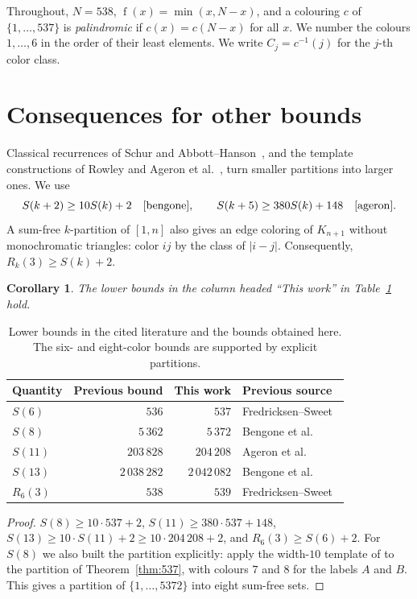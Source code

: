 \documentclass[11pt,a4paper]{article}
\newtheorem{corollary}[theorem]{Corollary}
\theoremstyle{definition}
\newcommand{\fold}{\operatorname{f}}
\begin{document}
Throughout, $N=538$, $\fold(x)=\min(x,N-x)$, and a colouring $c$ of
$\{1,\dots,537\}$ is \emph{palindromic} if $c(x)=c(N-x)$ for all $x$. We number the
colours $1,\dots,6$ in the order of their least elements. We write
$C_j=c^{-1}(j)$ for the $j$-th color class.

\section{Consequences for other bounds}\label{sec:consequences}
Classical recurrences of Schur and Abbott--Hanson~\cite{schur,abbott},
and the template constructions of Rowley and Ageron et al.~\cite{rowley,ageron},
turn smaller partitions into larger ones. We use
\[
S(k+2)\ge10S(k)+2\quad\text{\cite{bengone}},\qquad
S(k+5)\ge380S(k)+148\quad\text{\cite{ageron}}.
\]
A sum-free $k$-partition of $[1,n]$ also gives an edge coloring of $K_{n+1}$
without monochromatic triangles: color $ij$ by the class of $|i-j|$.
Consequently, $R_k(3)\ge S(k)+2$.

\begin{corollary}\label{cor:consequences}
The lower bounds in the column headed ``This work'' in Table~\ref{tab:bounds} hold.
\end{corollary}

\begin{table}[tbp]
\caption{Lower bounds in the cited literature and the bounds obtained here.
The six- and eight-color bounds are supported by explicit partitions.}
\label{tab:bounds}
\centering
\begin{tabular}{lrrl}
\toprule
Quantity & Previous bound & This work & Previous source\\
\midrule
$S(6)$    & $536$          & $537$            & Fredricksen--Sweet~\cite{fs}\\
$S(8)$    & $5\,362$       & $5\,372$         & Bengone et al.~\cite{bengone}\\
$S(11)$   & $203\,828$     & $204\,208$       & Ageron et al.~\cite{ageron}\\
$S(13)$   & $2\,038\,282$ & $2\,042\,082$    & Bengone et al.~\cite{bengone}\\
$R_6(3)$  & $538$          & $539$            & Fredricksen--Sweet~\cite{fs,xxer}\\
\bottomrule
\end{tabular}
\end{table}

\begin{proof}
$S(8)\ge10\cdot537+2$, $S(11)\ge380\cdot537+148$,
$S(13)\ge10\cdot S(11)+2\ge10\cdot204\,208+2$, and $R_6(3)\ge S(6)+2$. For $S(8)$ we also
built the partition explicitly: apply the width-$10$ template of
\cite[Table~II]{bengone} to the partition of Theorem~\ref{thm:537}, with colours $7$
and $8$ for the labels $A$ and $B$. This gives a partition of
$\{1,\dots,5372\}$ into eight sum-free sets.
\end{proof}
\end{document}

